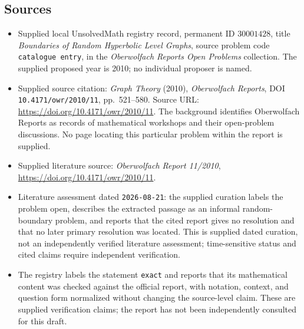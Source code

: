 \documentclass[11pt]{article}
\begin{document}
\subsection{Sources}
\begin{itemize}
\item Supplied local UnsolvedMath registry record, permanent ID \(30001428\), title \emph{Boundaries of Random Hyperbolic Level Graphs}, source problem code \texttt{catalogue entry}, in the \emph{Oberwolfach Reports Open Problems} collection. The supplied proposed year is 2010; no individual proposer is named.
\item Supplied source citation: \emph{Graph Theory} (2010), \emph{Oberwolfach Reports}, DOI \texttt{10.4171/owr/2010/11}, pp.~521--580. Source URL: \url{https://doi.org/10.4171/owr/2010/11}. The background identifies Oberwolfach Reports as records of mathematical workshops and their open-problem discussions. No page locating this particular problem within the report is supplied.
\item Supplied literature source: \emph{Oberwolfach Report 11/2010}, \url{https://doi.org/10.4171/owr/2010/11}.
\item Literature assessment dated \texttt{2026-08-21}: the supplied curation labels the problem open, describes the extracted passage as an informal random-boundary problem, and reports that the cited report gives no resolution and that no later primary resolution was located. This is supplied dated curation, not an independently verified literature assessment; time-sensitive status and cited claims require independent verification.
\item The registry labels the statement \texttt{exact} and reports that its mathematical content was checked against the official report, with notation, context, and question form normalized without changing the source-level claim. These are supplied verification claims; the report has not been independently consulted for this draft.
\end{itemize}
\end{document}

